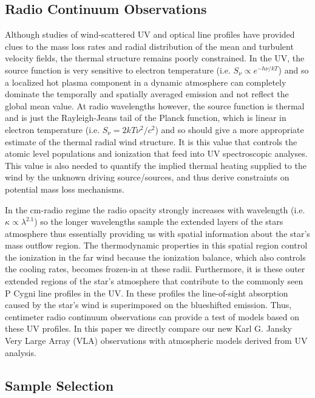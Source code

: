 \documentclass[iop]{emulateapj}
\begin{document}
\subsection{Radio Continuum Observations} \label{intro1} 

Although studies of wind-scattered UV and optical line profiles have provided clues to the mass loss rates and radial distribution of the mean and turbulent velocity fields, the thermal structure remains poorly constrained. In the UV, the source function is very sensitive to electron temperature (i.e. $S_{\nu} \propto e^{-h\nu /kT}$) and so a localized hot plasma component in a dynamic atmosphere can completely dominate the temporally and spatially averaged emission and not reflect the global mean value. At radio wavelengths however, the source function is thermal and is just the Rayleigh-Jeans tail of the Planck function, which is linear in electron temperature (i.e. $S_{\nu} = {2kT\nu ^2 /c^2}$) and so should give a more appropriate estimate of the thermal radial wind structure. It is this value that controls the atomic level populations and ionization that feed into UV spectroscopic analyses. This value is also needed to quantify the implied thermal heating supplied to the  wind by the unknown driving source/sources, and thus derive constraints on potential mass loss mechanisms.

In the cm-radio regime the radio opacity strongly increases with wavelength (i.e. $ \kappa \propto \lambda ^{2.1}$) so the longer wavelengths sample the extended layers of the stars atmosphere thus essentially providing us with spatial information about the star's mass outflow region. The thermodynamic properties in this spatial region control the ionization in the far wind because the ionization balance, which also controls the cooling rates, becomes frozen-in at these radii. Furthermore, it is these outer extended regions of the star's atmosphere that contribute to the commonly seen P Cygni line profiles in the UV. In these profiles the line-of-sight absorption caused by the star's wind is superimposed on the blueshifted emission. Thus, centimeter radio continuum observations can provide a test of models based on these UV profiles. In this paper we directly compare our new Karl G. Jansky Very Large Array (VLA) observations with atmospheric models derived from UV analysis.

\subsection{Sample Selection} \label{intro2}
\end{document}
